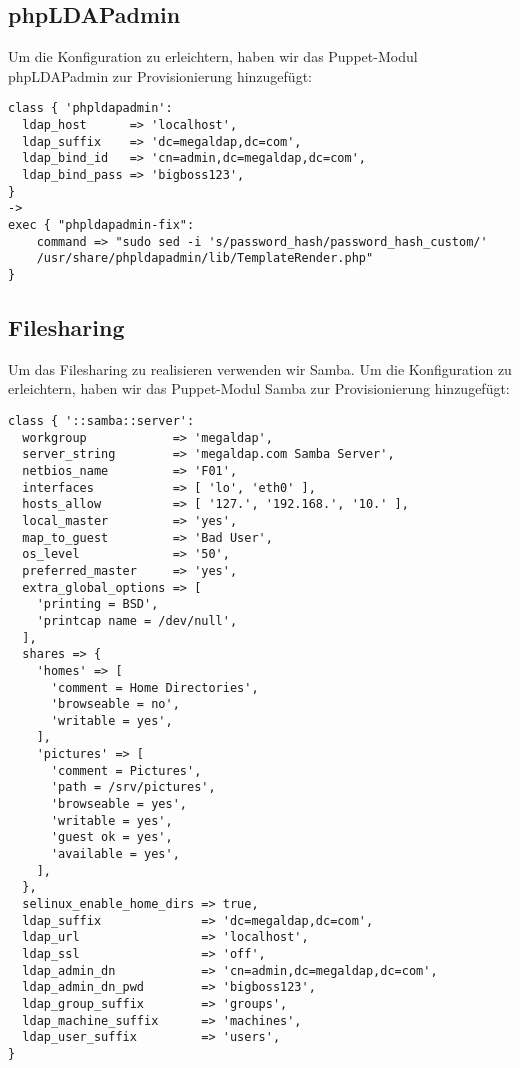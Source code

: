 \documentclass[main.tex]{subfiles}
\begin{document}
\subsection{phpLDAPadmin}
Um die Konfiguration zu erleichtern, haben wir das Puppet-Modul phpLDAPadmin zur 
Provisionierung hinzugefügt:

\begin{lstlisting}  
class { 'phpldapadmin':
  ldap_host      => 'localhost',
  ldap_suffix    => 'dc=megaldap,dc=com',
  ldap_bind_id   => 'cn=admin,dc=megaldap,dc=com',
  ldap_bind_pass => 'bigboss123',
}
->
exec { "phpldapadmin-fix":
    command => "sudo sed -i 's/password_hash/password_hash_custom/' 
    /usr/share/phpldapadmin/lib/TemplateRender.php"
}
\end{lstlisting}

\newpage

\subsection{Filesharing}
Um das Filesharing zu realisieren verwenden wir Samba.
Um die Konfiguration zu erleichtern, haben wir das Puppet-Modul Samba zur
Provisionierung hinzugefügt:

\begin{lstlisting}
class { '::samba::server':
  workgroup            => 'megaldap',
  server_string        => 'megaldap.com Samba Server',
  netbios_name         => 'F01',
  interfaces           => [ 'lo', 'eth0' ],
  hosts_allow          => [ '127.', '192.168.', '10.' ],
  local_master         => 'yes',
  map_to_guest         => 'Bad User',
  os_level             => '50',
  preferred_master     => 'yes',
  extra_global_options => [
    'printing = BSD',
    'printcap name = /dev/null',
  ],
  shares => {
    'homes' => [
      'comment = Home Directories',
      'browseable = no',
      'writable = yes',
    ],
    'pictures' => [
      'comment = Pictures',
      'path = /srv/pictures',
      'browseable = yes',
      'writable = yes',
      'guest ok = yes',
      'available = yes',
    ],
  },
  selinux_enable_home_dirs => true,
  ldap_suffix              => 'dc=megaldap,dc=com',
  ldap_url                 => 'localhost',
  ldap_ssl                 => 'off',
  ldap_admin_dn            => 'cn=admin,dc=megaldap,dc=com',
  ldap_admin_dn_pwd        => 'bigboss123',
  ldap_group_suffix        => 'groups',
  ldap_machine_suffix      => 'machines',
  ldap_user_suffix         => 'users',
}
\end{lstlisting}
\end{document}
